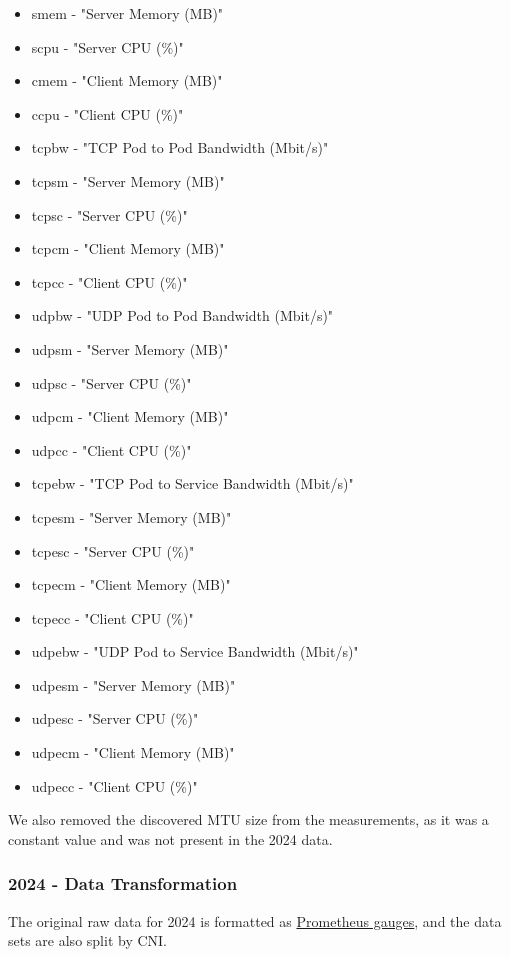 \begin{itemize}
    \item smem - "Server Memory (MB)"
    \item scpu - "Server CPU (\%)"
    \item cmem - "Client Memory (MB)"
    \item ccpu - "Client CPU (\%)"
    \item tcpbw - "TCP Pod to Pod Bandwidth (Mbit/s)"
    \item tcpsm - "Server Memory (MB)"
    \item tcpsc - "Server CPU (\%)"
    \item tcpcm - "Client Memory (MB)"
    \item tcpcc - "Client CPU (\%)"
    \item udpbw - "UDP Pod to Pod Bandwidth (Mbit/s)"
    \item udpsm - "Server Memory (MB)"
    \item udpsc - "Server CPU (\%)"
    \item udpcm - "Client Memory (MB)"
    \item udpcc - "Client CPU (\%)"
    \item tcpebw - "TCP Pod to Service Bandwidth (Mbit/s)"
    \item tcpesm - "Server Memory (MB)"
    \item tcpesc - "Server CPU (\%)"
    \item tcpecm - "Client Memory (MB)"
    \item tcpecc - "Client CPU (\%)"
    \item udpebw - "UDP Pod to Service Bandwidth (Mbit/s)"
    \item udpesm - "Server Memory (MB)"
    \item udpesc - "Server CPU (\%)"
    \item udpecm - "Client Memory (MB)"
    \item udpecc - "Client CPU (\%)"
\end{itemize}

We also removed the discovered MTU size from the measurements, as it was a constant value and was not present in the 2024 data.

\subsubsection{2024 - Data Transformation}

The original raw data for 2024 is formatted as \href{https://prometheus.io/docs/concepts/metric_types/#gauge}{Prometheus gauges}, and the data sets are also split by CNI.


